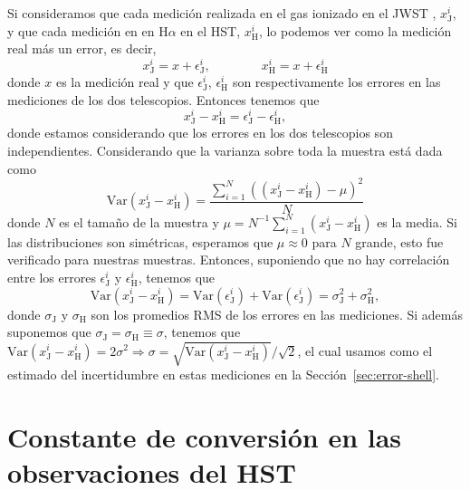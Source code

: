 \documentclass{book}
\begin{document}
Si consideramos que cada medición realizada en el gas ionizado en el JWST , $x_\mathrm{J}^i$, y que cada medición en en H$\alpha$ en el HST, $x_\mathrm{H}^i$, lo podemos ver como la medición real más un error, es decir,
\begin{equation}
    x_\mathrm{J}^i=x+\epsilon_\mathrm{J}^i,  \qquad
    \qquad
    x_\mathrm{H}^i=x+\epsilon_\mathrm{H}^i
\end{equation}
donde $x$ es la medición real y que $\epsilon_\mathrm{J}^i$, $\epsilon_\mathrm{H}^i$ son respectivamente los errores en las mediciones de los dos telescopios. Entonces tenemos que
\begin{equation}
    x_\mathrm{J}^i-x_\mathrm{H}^i=\epsilon_\mathrm{J}^i-\epsilon_\mathrm{H}^i,
\end{equation}
donde estamos considerando que los errores en los dos telescopios son independientes. Considerando que la varianza sobre toda la muestra está dada como
\begin{equation}
    \mathrm{Var}(x_\mathrm{J}^i-x_\mathrm{H}^i)=\frac{\sum_{i=1}^N ((x_\mathrm{J}^i-x_\mathrm{H}^i)-\mu)^2}{N}
\end{equation}
donde $N$ es el tamaño de la muestra y $\mu = N^{-1} \sum_{i=1}^N (x_\mathrm{J}^i-x_\mathrm{H}^i)$ es la media. 
Si las distribuciones son simétricas, esperamos que $\mu \approx 0$ para $N$ grande, esto fue verificado para nuestras muestras.
Entonces, suponiendo que no hay correlación entre los errores $\epsilon_\mathrm{J}^i$ y $\epsilon_\mathrm{H}^i$, tenemos que
\begin{equation}
    \mathrm{Var}(x_\mathrm{J}^i-x_\mathrm{H}^i)=\mathrm{Var}(\epsilon_\mathrm{J}^i)+\mathrm{Var}(\epsilon_\mathrm{J}^i)=\sigma_\mathrm{J}^2+\sigma_\mathrm{H}^2,
\end{equation}
donde $\sigma_\mathrm{J}$ y $\sigma_\mathrm{H}$
son los promedios RMS de los errores en las mediciones. 
Si además suponemos que $\sigma_\mathrm{J} = \sigma_\mathrm{H} \equiv   \sigma$, tenemos que $\mathrm{Var}(x_\mathrm{J}^i-x_\mathrm{H}^i)=2\sigma^2\Rightarrow\sigma=\sqrt{\mathrm{Var}(x_\mathrm{J}^i-x_\mathrm{H}^i)}/\sqrt{2}$, el cual usamos como el estimado del incertidumbre en estas mediciones en la Sección~\ref{sec:error-shell}.


\chapter{Constante de conversión en las observaciones del HST} \label{AP : conversion EM}
\end{document}
